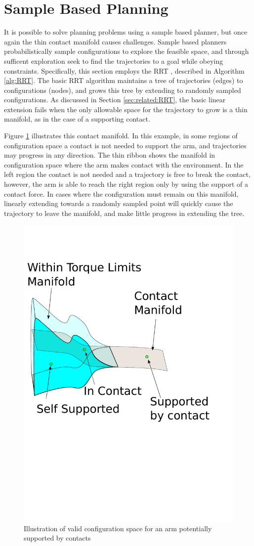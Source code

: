 \documentclass[../thesis.tex]{subfiles}
\begin{document}
\section{Sample Based Planning} \label{sec:sample_planning}
It is possible to solve planning problems using a sample based planner, but once again the thin contact manifold causes challenges.
Sample based planners probabilistically sample configurations to explore the feasible space, and through sufficent exploration seek to find the trajectories to a goal while obeying constraints.
Specifically, this section employs the RRT \cite{LaValle1998}, described in Algorithm \ref{alg:RRT}.
The basic RRT algorithm maintains a tree of trajectories (edges) to configurations (nodes), and grows this tree by extending to randomly sampled configurations.
As discussed in Section \ref{sec:related:RRT}, the basic linear extension fails when the only allowable space for the trajectory to grow is a thin manifold, as in the case of a supporting contact.

Figure \ref{fig:thin_manifold} illustrates this contact manifold.
In this example, in some regions of configuration space a contact is not needed to support the arm, and trajectories may progress in any direction.
The thin ribbon shows the manifold in configuration space where the arm makes contact with the environment. In the left region the contact is not needed and a trajectory is free to break the contact, however, the arm is able to reach the right region only by using the support of a contact force.
In cases where the configuration must remain on this manifold, linearly extending towards a randomly sampled point will quickly cause the trajectory to leave the manifold, and make little progress in extending the tree.



\begin{figure}
  \centering
  \includegraphics[width=.5\linewidth]{./Planning/thin_manifold.pdf}
  
  \caption{Illustration of valid configuration space for an arm potentially supported by contacts}
  \label{fig:thin_manifold}
\end{figure}
\end{document}
